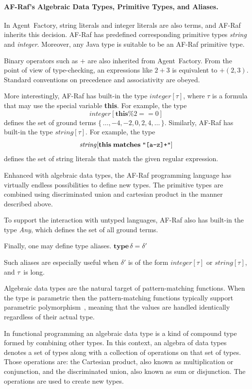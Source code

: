 \documentclass[a4paper,12pt,oneside,fleqn]{book} %
\newcommand{\todo}[1]{[\textcolor{red}{TODO}: #1]}
\renewcommand{\todo}{}
\begin{document}
\paragraph{AF-Raf's Algebraic Data Types, Primitive Types, and Aliases.}
In Agent~Factory, string literals and integer literals are
also terms, and AF-Raf inherits this decision. AF-Raf has
predefined corresponding primitive types \textit{string} and
\textit{integer}. Moreover, any Java type is suitable to be an AF-Raf
primitive type.

Binary operators such as $+$ are also inherited from Agent~Factory. From
the point of view of type-checking, an expressions like $2+3$ is equivalent
to $+(2,3)$. Standard conventions on precedence and associativity are
obeyed.

More interestingly, AF-Raf has built-in the type $\mathit{integer}[\tau]$,
where $\tau$ is a formula that may use the special variable \textbf{this}.
For example, the type \[\mathit{integer}[\mathbf{this}\%2==0]\] defines the
set of ground terms $\{\,\ldots,-4,-2,0,2,4,\ldots\,\}$. Similarly, AF-Raf
has built-in the type $\mathit{string}[\tau]$. For example, the type
\[\mathit{string}[\mathbf{this}\;\mathbf{matches}\;\verb|"[a-z]+"|]\]
defines the set of string literals that match the given regular expression.

Enhanced with algebraic data types, the AF-Raf programming language has
virtually endless possibilities to define new types. The primitive types
are combined using discriminated union and cartesian product in the manner
described above.

To support the interaction with untyped languages, AF-Raf also has built-in
the type \textit{Any}, which defines the set of all ground terms.

Finally, one may define type aliases.
$\mathbf{type}\,\delta=\delta'$

Such aliases are especially useful when $\delta'$ is of the form
$\mathit{integer}[\tau]$ or $\mathit{string}[\tau]$, and $\tau$~is long.


Algebraic data types are the natural target of pattern-matching functions.
When the type is parametric then the pattern-matching functions typically
support parametric polymorphism~\cite{AlgebraicDT09}, meaning that the
values are handled identically regardless of their actual type.

In functional programming an algebraic data type is a kind of compound type
formed by combining other types. In this context, an algebra of data types
denotes a set of types along with a collection of operations on that set of
types. Those operations are: the Cartesian product, also known as
multiplication or conjunction, and the discriminated union, also known as
sum or disjunction. The operations are used to create new types.
\end{document}
